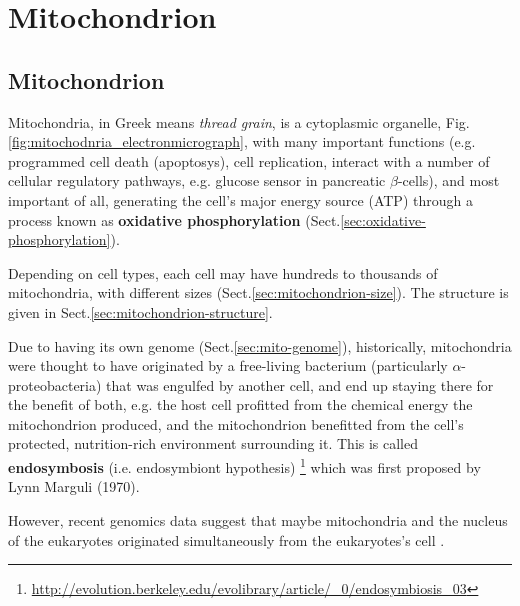 


\chapter{Mitochondrion}


\section{Mitochondrion}
\label{sec:mito_intro}
\label{sec:mitochondria}

Mitochondria, in Greek means {\it thread grain}, is a cytoplasmic organelle,
Fig.\ref{fig:mitochodnria_electronmicrograph}, with many important functions
(e.g. programmed cell death (apoptosys), cell replication, interact with a
number of cellular regulatory pathways, e.g. glucose sensor in pancreatic
$\beta$-cells), and most important of all, generating the cell's major energy
source (ATP) through a process known as {\bf oxidative phosphorylation}
(Sect.\ref{sec:oxidative-phosphorylation}).

Depending on cell types, each cell may have hundreds to thousands of
mitochondria, with different sizes (Sect.\ref{sec:mitochondrion-size}).
The structure is given in Sect.\ref{sec:mitochondrion-structure}.

Due to having its own genome (Sect.\ref{sec:mito-genome}), historically,
mitochondria were thought to have originated by a free-living bacterium
(particularly $\alpha$-proteobacteria) that was engulfed by another cell, and
end up staying there for the benefit of both, e.g. the host cell profitted from
the chemical energy the mitochondrion produced, and the mitochondrion benefitted
from the cell's protected, nutrition-rich environment surrounding it. This is
called {\bf endosymbosis} (i.e. endosymbiont hypothesis)
\footnote{\url{http://evolution.berkeley.edu/evolibrary/article/_0/endosymbiosis_03}}
which was first proposed by  Lynn Marguli (1970).

However, recent genomics data suggest that maybe mitochondria and the nucleus of
the eukaryotes originated simultaneously from the eukaryotes's cell
\citep{gray1999, gray2001, gray2012}.


